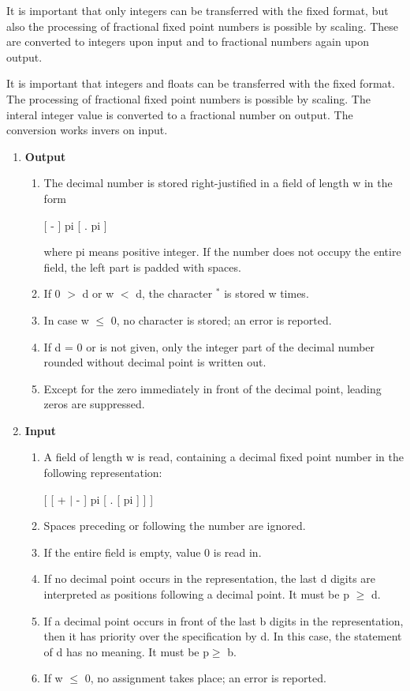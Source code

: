 \begin{removed}
It is important that only integers can be transferred with the fixed
format, but also the processing of fractional fixed point numbers is
possible by scaling. These are converted to integers upon input and to
fractional numbers again upon output.
\end{removed}

\begin{added}
It is important that 
 integers and floats can be transferred with the fixed
format. 
The processing of fractional fixed point numbers is
possible by scaling. The interal integer value is converted to a fractional 
number on output. The conversion works invers on input.
\end{added}

\begin{removed}
\begin{enumerate}
\item {\bf Output}
\begin{enumerate}
\item The decimal number is stored right-justified in a field of length
w in the form

[ - ] pi [ . pi ]

where pi means positive integer. If the number does not occupy the
entire field, the left part is padded with spaces.
\item If 0 $>$ d or w $<$ d, the character $^*$ is stored w times.
\item In case w $\leq$ 0, no character is stored; an error is reported.
\item If d = 0 or is not given, only the integer part of the decimal
number rounded without decimal point is written out.
\item Except for the zero immediately in front of the decimal point,
leading zeros are suppressed.
\end{enumerate}
\item {\bf Input}
\begin{enumerate}
\item A field of length w is read, containing a decimal fixed point
number in the following representation:

[ [ + $\mid$ - ] pi [ . [ pi ] ] ]

\item Spaces preceding or following the number are ignored.
\item If the entire field is empty, value 0 is read in.
\item If no decimal point occurs in the representation, the last d
digits are interpreted as positions following a decimal point. It must
be p $\geq$ d.
\item If a decimal point occurs in front of the last b digits in the
representation, then it has priority over the specification by d. In
this case, the statement of d has no meaning. It must be p$\geq$ b.
\item If w $\leq$ 0, no assignment takes place; an error is reported.
\end{enumerate}
\end{enumerate}


\end{removed}
